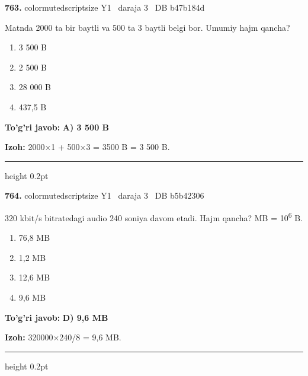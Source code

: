 \documentclass[10pt,a4paper,oneside]{article}
\begin{document}
\noindent\textbf{\color{ink}763.}  {color{muted}scriptsize Y1 \textbullet\ daraja 3 \textbullet\ DB b47b184d}
\par
Matnda 2000 ta bir baytli va 500 ta 3 baytli belgi bor. Umumiy hajm qancha?
\begin{enumerate}[label=\Alph*),leftmargin=9mm]
\item 3 500 B
\item 2 500 B
\item 28 000 B
\item 437,5 B
\end{enumerate}
\begin{tcolorbox}[enhanced,breakable,colback=teal!4,colframe=teal!50!black,boxrule=0.5pt,arc=1.1mm,left=3mm,right=3mm,top=1.7mm,bottom=1.7mm,before skip=2mm,after skip=2mm]
\textbf{\color{teal}To'g'ri javob:} \textbf{A) 3 500 B}
\par\smallskip
\textbf{Izoh:} 2000\ensuremath{\times}1 + 500\ensuremath{\times}3 = 3500 B = 3 500 B.
\end{tcolorbox}
\vspace{2mm}\hrule height 0.2pt \vspace{3mm}

\noindent\textbf{\color{ink}764.}  {color{muted}scriptsize Y1 \textbullet\ daraja 3 \textbullet\ DB b5b42306}
\par
320 kbit/s bitratedagi audio 240 soniya davom etadi. Hajm qancha? MB = 10\textsuperscript{6} B.
\begin{enumerate}[label=\Alph*),leftmargin=9mm]
\item 76,8 MB
\item 1,2 MB
\item 12,6 MB
\item 9,6 MB
\end{enumerate}
\begin{tcolorbox}[enhanced,breakable,colback=teal!4,colframe=teal!50!black,boxrule=0.5pt,arc=1.1mm,left=3mm,right=3mm,top=1.7mm,bottom=1.7mm,before skip=2mm,after skip=2mm]
\textbf{\color{teal}To'g'ri javob:} \textbf{D) 9,6 MB}
\par\smallskip
\textbf{Izoh:} 320000\ensuremath{\times}240/8 = 9,6 MB.
\end{tcolorbox}
\vspace{2mm}\hrule height 0.2pt \vspace{3mm}
\end{document}
